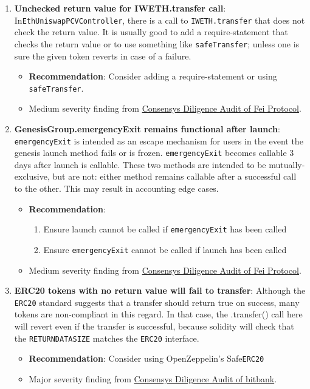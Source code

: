 \begin{enumerate}
\item\textbf{Unchecked return value for IWETH.transfer call}: In\linebreak\verb|EthUniswapPCVController|, there is a call to \verb|IWETH.transfer|  that does not check the return value. It is usually good to add a require-statement that checks the return value or to use something like \verb|safeTransfer|; unless one is sure the given token reverts in case of a failure.
	\begin{itemize}
	\item\textbf{Recommendation}: Consider adding a require-statement or using \verb|safeTransfer|.
	\item Medium severity finding from \href{https://consensys.net/diligence/audits/2021/01/fei-protocol/\#unchecked-return-value-for-iweth-transfer-call}{Consensys Diligence Audit of Fei Protocol}.
	\end{itemize}

\item\textbf{GenesisGroup.emergencyExit remains functional after launch}: \verb|emergencyExit| is intended as an escape mechanism for users in the event the genesis launch method fails or is frozen. \verb|emergencyExit|  becomes callable 3 days after launch is callable. These two methods are intended to be mutually-exclusive, but are not: either method remains callable after a successful call to the other. This may result in accounting edge cases.
	\begin{itemize}
	\item\textbf{Recommendation}:
	    \begin{enumerate}
	    \item Ensure launch cannot be called if \verb|emergencyExit|  has been called
	    \item Ensure \verb|emergencyExit|  cannot be called if launch has been called
	    \end{enumerate}
	\item Medium severity finding from \href{https://consensys.net/diligence/audits/2021/01/fei-protocol/\#genesisgroup-emergencyexit-remains-functional-after-launch}{Consensys Diligence Audit of Fei Protocol}.
	\end{itemize}

\item\textbf{ERC20 tokens with no return value will fail to transfer}: Although the \verb|ERC20| standard suggests that a transfer should return true on success, many tokens are non-compliant in this regard. In that case, the .transfer() call here will revert even if the transfer is successful, because solidity will check that the \verb|RETURNDATASIZE| matches the \verb|ERC20| interface.
	\begin{itemize}
	\item\textbf{Recommendation}: Consider using OpenZeppelin’s Safe\verb|ERC20|
	\item Major severity finding from \href{https://consensys.net/diligence/audits/2020/11/bitbank/\#ERC20-tokens-with-no-return-value-will-fail-to-transfer}{Consensys Diligence Audit of bitbank}.
	\end{itemize}


\end{enumerate}
